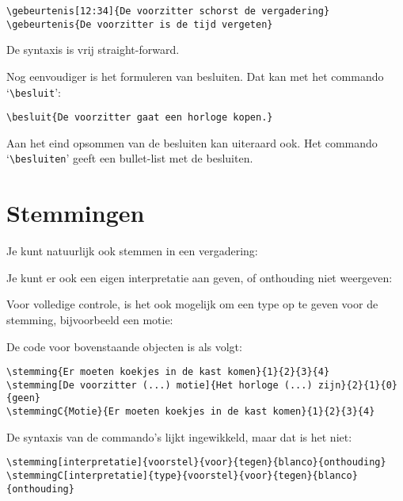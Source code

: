 \documentclass[a4paper]{notulen}
\begin{document}
		\begin{lstlisting}
\gebeurtenis[12:34]{De voorzitter schorst de vergadering}
\gebeurtenis{De voorzitter is de tijd vergeten}
		\end{lstlisting}
		
		De syntaxis is vrij straight-forward.
		
		Nog eenvoudiger is het formuleren van besluiten. Dat kan met het commando `\lstinline!\besluit!':
		
		
		\begin{lstlisting}
\besluit{De voorzitter gaat een horloge kopen.}
		\end{lstlisting}
	
		Aan het eind opsommen van de besluiten kan uiteraard ook. Het commando `\lstinline!\besluiten!' geeft een bullet-list met de besluiten.
	
	\section{Stemmingen}
		Je kunt natuurlijk ook stemmen in een vergadering:
		
		
		Je kunt er ook een eigen interpretatie aan geven, of onthouding niet weergeven:
		
		
		Voor volledige controle, is het ook mogelijk om een type op te geven voor de stemming, bijvoorbeeld een motie:
		
		
		De code voor bovenstaande objecten is als volgt:
		
		\begin{lstlisting}
\stemming{Er moeten koekjes in de kast komen}{1}{2}{3}{4}
\stemming[De voorzitter (...) motie]{Het horloge (...) zijn}{2}{1}{0}{geen}
\stemmingC{Motie}{Er moeten koekjes in de kast komen}{1}{2}{3}{4}
		\end{lstlisting}
		
		De syntaxis van de commando's lijkt ingewikkeld, maar dat is het niet:
		
		\begin{lstlisting}
\stemming[interpretatie]{voorstel}{voor}{tegen}{blanco}{onthouding}
\stemmingC[interpretatie]{type}{voorstel}{voor}{tegen}{blanco}{onthouding}
		\end{lstlisting}
		
\end{document}
